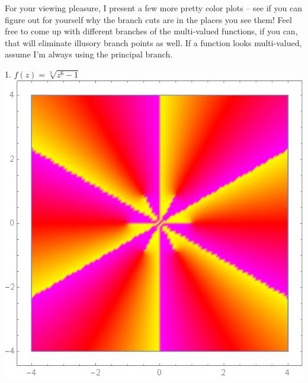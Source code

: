 For your viewing pleasure, I present a few more pretty color plots -- see if you can figure out for yourself why the branch cuts are in the places you see them! Feel free to come up with different branches of the multi-valued functions, if you can, that will eliminate illusory branch points as well. If a function looks multi-valued, assume I'm always using the principal branch.

\begin{center}
    1. $f(z) = \sqrt[3]{z^6-1}$ \\
    \includegraphics[scale=0.27]{images/cbrtzsixminus1.png}
\end{center}

